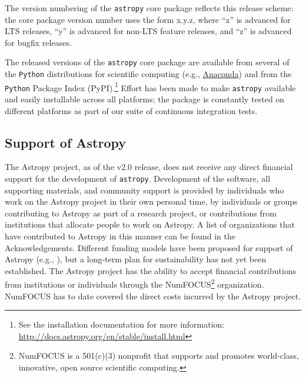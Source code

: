 \documentclass[modern]{aastex61}
\newcommand{\package}[1]{\texttt{#1}\xspace}
\newcommand{\python}{\package{Python}}
\newcommand{\astropy}{Astropy\xspace}
\newcommand{\astropypkg}{\package{astropy}}
\begin{document}
The version numbering of the \astropypkg core package reflects this release
scheme: the core package version number uses the form x.y.z, where ``x'' is
advanced for LTS releases, ``y'' is advanced for non-LTS feature releases, and
``z'' is advanced for bugfix releases.

The released versions of the \astropypkg core package are available from several
of the \python distributions for scientific computing (e.g.,
\href{http://anaconda.org}{Anaconda}) and from the \python Package Index
(PyPI).\footnote{See the installation documentation for more information:
\url{http://docs.astropy.org/en/stable/install.html}}
Effort has been made to make \astropypkg available and easily installable across
all platforms; the package is constantly tested on different platforms as part
of our suite of continuous integration tests.

\subsection{Support of Astropy}

The \astropy project, as of the v2.0 release, does not receive any direct financial support for
the development of \astropypkg.  Development of the software, all supporting materials, and community support is provided
by individuals who work on the \astropy project in their own personal
time, by individuals or groups contributing to \astropy as
part of a research project, or contributions from institutions that allocate
people to work on \astropy.
A list of organizations that have contributed to \astropy in this manner
can be found in the Acknowledgements.
Different funding models have been proposed for support of \astropy
(e.g., \cite{2016arXiv161003159M}), but a long-term plan
for sustainability has not yet been established.
The \astropy project has the ability to accept financial contributions
from institutions or individuals through the NumFOCUS\footnote{NumFOCUS
is a 501(c)(3) nonprofit that supports and promotes world-class, innovative,
open source scientific computing.} organization. NumFOCUS has to date covered the direct costs incurred by the \astropy project.



\end{document}
